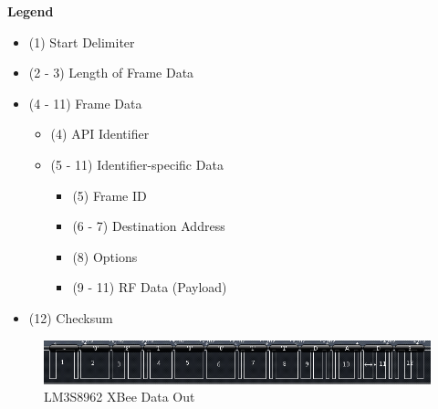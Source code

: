 \documentclass[11pt, titlepage]{article}
\begin{document}
            \textbf{Legend}
            \begin{itemize}
                \item (1) Start Delimiter
                \item (2 - 3) Length of Frame Data
                \item (4 - 11) Frame Data
                    \begin{itemize}
                        \item (4) API Identifier
                        \item (5 - 11) Identifier-specific Data
                            \begin{itemize}
                                \item (5) Frame ID
                                \item (6 - 7) Destination Address
                                \item (8) Options
                                \item (9 - 11) RF Data (Payload)
                            \end{itemize}
                    \end{itemize}
                \item (12) Checksum
            \end{itemize}
            
            \FloatBarrier
            \begin{figure}[htbp]
                \centering
                \includegraphics[scale = 0.8]{Screenshots/8962_out.png}
                \caption{LM3S8962 XBee Data Out}
            \end{figure}
            \FloatBarrier
            
\end{document}
